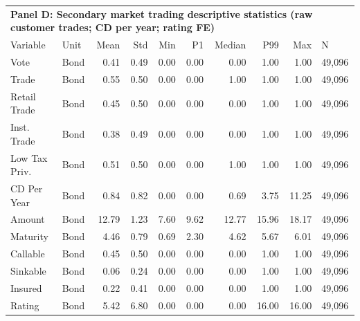 \begin{table}[H]
\centering
\begin{tabular*}{\textwidth}{@{\extracolsep{\fill}}llrrrrrrrl}
\multicolumn{10}{l}{\textbf{Panel D: Secondary market trading descriptive statistics (raw customer trades; CD per year; rating FE)}}\\

\addlinespace
  \toprule
Variable & Unit & Mean & Std & Min & P1 & Median & P99 & Max & N \\ 
  \hline
Vote & Bond & 0.41 & 0.49 & 0.00 & 0.00 & 0.00 & 1.00 & 1.00 & 49,096 \\ 
  Trade & Bond & 0.55 & 0.50 & 0.00 & 0.00 & 1.00 & 1.00 & 1.00 & 49,096 \\ 
  Retail Trade & Bond & 0.45 & 0.50 & 0.00 & 0.00 & 0.00 & 1.00 & 1.00 & 49,096 \\ 
  Inst. Trade & Bond & 0.38 & 0.49 & 0.00 & 0.00 & 0.00 & 1.00 & 1.00 & 49,096 \\ 
  Low Tax Priv. & Bond & 0.51 & 0.50 & 0.00 & 0.00 & 1.00 & 1.00 & 1.00 & 49,096 \\ 
  CD Per Year & Bond & 0.84 & 0.82 & 0.00 & 0.00 & 0.69 & 3.75 & 11.25 & 49,096 \\ 
  Amount & Bond & 12.79 & 1.23 & 7.60 & 9.62 & 12.77 & 15.96 & 18.17 & 49,096 \\ 
  Maturity & Bond & 4.46 & 0.79 & 0.69 & 2.30 & 4.62 & 5.67 & 6.01 & 49,096 \\ 
  Callable & Bond & 0.45 & 0.50 & 0.00 & 0.00 & 0.00 & 1.00 & 1.00 & 49,096 \\ 
  Sinkable & Bond & 0.06 & 0.24 & 0.00 & 0.00 & 0.00 & 1.00 & 1.00 & 49,096 \\ 
  Insured & Bond & 0.22 & 0.41 & 0.00 & 0.00 & 0.00 & 1.00 & 1.00 & 49,096 \\ 
  Rating & Bond & 5.42 & 6.80 & 0.00 & 0.00 & 0.00 & 16.00 & 16.00 & 49,096 \\ 
   \hline
\end{tabular*}
\end{table}
